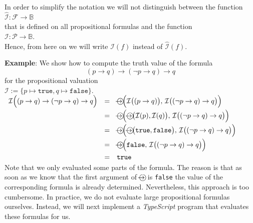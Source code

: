 In order to simplify the notation we will not distinguish between the function
\\[0.2cm]
\hspace*{1.3cm}
$\widehat{\mathcal{I}}: \mathcal{F} \rightarrow \mathbb{B}$
\\[0.2cm]
that is defined on all propositional formulas and the function
\\[0.2cm]
\hspace*{1.3cm}
$\mathcal{I}: \mathcal{P} \rightarrow \mathbb{B}$.
\\[0.2cm]
Hence, from here on we will write $\mathcal{I}(f)$ instead of $\widehat{\mathcal{I}}(f)$.

\noindent
\textbf{Example}: We show how to compute the truth value of the formula
$$  (p \rightarrow q) \rightarrow (\neg p \rightarrow q) \rightarrow q $$
for the propositional valuation
\\[0.2cm]
\hspace*{1.3cm}
$\mathcal{I} := \{ p \mapsto \mathtt{true}, q \mapsto \mathtt{false} \}$.
\\[0.2cm]
\hspace*{1.3cm}
$
  \begin{array}[b]{lcl}
   \mathcal{I}\Bigl( (p \rightarrow q) \rightarrow (\neg p \rightarrow q) \rightarrow q  \Bigr) 
   & = &  \circright\Bigl( \mathcal{I}\bigl( (p \rightarrow q) \bigr),\, \mathcal{I}\bigl((\neg p \rightarrow q) \rightarrow q\bigr) \Bigr) \\[0.2cm]
   & = & \circright\Bigl( \circright\bigl( \mathcal{I}(p), \mathcal{I}(q) \bigr),\, \mathcal{I}\bigl((\neg p \rightarrow q) \rightarrow q\bigr) \Bigr) \\[0.2cm]
   & = & \circright\Bigl( \circright\bigl( \texttt{true}, \texttt{false} \bigr),\, \mathcal{I}\bigl((\neg p \rightarrow q) \rightarrow q\bigr) \Bigr) \\[0.2cm]
   & = & \circright\Bigl( \texttt{false}, \, \mathcal{I}\bigl((\neg p \rightarrow q) \rightarrow q\bigr) \Bigr) \\[0.2cm]
   & = & \texttt{true} 
  \end{array}
$ \eox
\\[0.2cm]
Note that we only evaluated some parts of the formula.  The reason is that as soon as we know that the first
argument of $\circright$ is \texttt{false} the value of the corresponding formula is already determined.
Nevertheless, this approach is too cumbersome.  In practice, we do not evaluate large propositional formulas
ourselves.  Instead, we will next implement a \textsl{TypeScript} program that evaluates these formulas for us.

